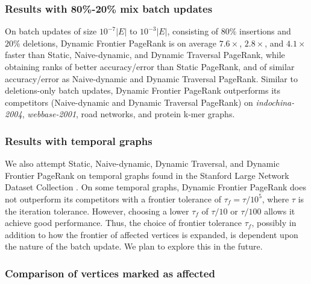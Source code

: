 \subsubsection{Results with 80\%-20\% mix batch updates}

On batch updates of size $10^{-7}|E|$ to $10^{-3}|E|$, consisting of $80\%$ insertions and $20\%$ deletions, Dynamic Frontier PageRank is on average $7.6\times$, $2.8\times$, and $4.1\times$ faster than Static, Naive-dynamic, and Dynamic Traversal PageRank, while obtaining ranks of better accuracy/error than Static PageRank, and of similar accuracy/error as Naive-dynamic and Dynamic Traversal PageRank. Similar to deletions-only batch updates, Dynamic Frontier PageRank outperforms its competitors (Naive-dynamic and Dynamic Traversal PageRank) on \textit{indochina-2004}, \textit{webbase-2001}, road networks, and protein k-mer graphs.


\subsubsection{Results with temporal graphs}

We also attempt Static, Naive-dynamic, Dynamic Traversal, and Dynamic Frontier PageRank on temporal graphs found in the Stanford Large Network Dataset Collection \cite{snap14}. On some temporal graphs, Dynamic Frontier PageRank does not outperform its competitors with a frontier tolerance of $\tau_f = \tau / 10^5$, where $\tau$ is the iteration tolerance. However, choosing a lower $\tau_f$ of $\tau / 10$ or $\tau / 100$ allows it achieve good performance. Thus, the choice of frontier tolerance $\tau_f$, possibly in addition to how the frontier of affected vertices is expanded, is dependent upon the nature of the batch update. We plan to explore this in the future.


\subsubsection{Comparison of vertices marked as affected}


